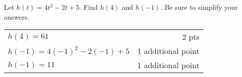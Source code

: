 

{
	Let $h(t)=4t^2-2t+5$. Find  $h(4)$ and  $h(-1).$  Be sure to simplify your answers.
	
}
{
	\begin{tabular}{l r}
	$h(4)=61$ & 2 pts\\
	$h(-1)=4(-1)^2-2(-1)+5$ & 1 additional point\\
	$h(-1)=11$ & 1 additional point
	\end{tabular}
}
